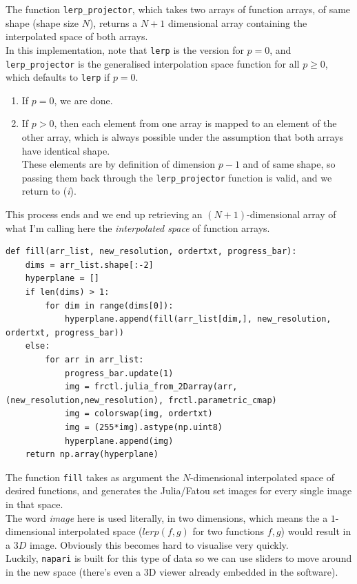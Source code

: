 \documentclass{article}
\begin{document}
The function \texttt{lerp\_projector}, which takes two arrays of function arrays, of same shape (shape size $N$), returns a $N+1$ dimensional array containing the interpolated space of both arrays. \\
\vspace{5mm}
In this implementation, note that \texttt{lerp} is the version for $p=0$, and \texttt{lerp\_projector} is the generalised interpolation space function for all $p \geq 0$, which defaults to \texttt{lerp} if $p = 0$. \\
\vspace{5mm}
\begin{enumerate}[label=(\textit{\roman*})]
\item If $p = 0$, we are done. \\ 
\item If $p > 0$, then each element from one array is mapped to an element of the other array, which is always possible under the assumption that both arrays have identical shape. \\
These elements are by definition of dimension $p-1$ and of same shape, so passing them back through the \texttt{lerp\_projector} function is valid, and we return to (\textit{i}).
\end{enumerate}
This process ends and we end up retrieving an $(N+1)$-dimensional array of what I'm calling here the \textit{interpolated space} of function arrays. \\
\vspace{5mm}

\begin{lstlisting}
def fill(arr_list, new_resolution, ordertxt, progress_bar):
    dims = arr_list.shape[:-2]
    hyperplane = []
    if len(dims) > 1:
        for dim in range(dims[0]):
            hyperplane.append(fill(arr_list[dim,], new_resolution, ordertxt, progress_bar))
    else:
        for arr in arr_list:
            progress_bar.update(1)
            img = frctl.julia_from_2Darray(arr, (new_resolution,new_resolution), frctl.parametric_cmap)
            img = colorswap(img, ordertxt)
            img = (255*img).astype(np.uint8)
            hyperplane.append(img)
    return np.array(hyperplane)
\end{lstlisting}

The function \texttt{fill} takes as argument the $N$-dimensional interpolated space of desired functions, and generates the Julia/Fatou set images for every single image in that space. \\
The word \textit{image} here is used literally, in two dimensions, which means the a $1$-dimensional interpolated space ($lerp(f,g)$ for two functions $f,g$) would result in a $3D$ image. Obviously this becomes hard to visualise very quickly. \\
\vspace{2mm}
Luckily, \texttt{napari} is built for this type of data so we can use sliders to move around in the new space (there's even a 3D viewer already embedded in the software). \\
\vspace{5mm}
\end{document}
